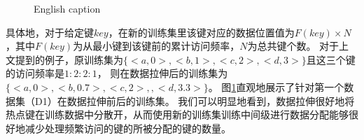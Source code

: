 
\begin{figure}[!htp]
  \centering
    {English caption}
  \label{fig:stretch}
\end{figure}

具体地，对于给定键$key$，在新的训练集里该键对应的数据位置值为$F(key) \times N$，其中$F(key)$为从最小键到该键前的累计访问频率，$N$为总共键个数。
对于上文提到的例子，原训练集为$\{<a, 0>, <b, 1>, <c, 2>, <d, 3>\}$且这三个键的访问频率是$1:2:2:1$，
则在数据拉伸后的训练集为$\{<a, 0>, <b, 0.7>, <c, 2>, , <d, 3.3>\}$。
图\ref{fig:stretch}直观地展示了针对第一个数据集（D1）在数据拉伸前后的训练集。
我们可以明显地看到，数据拉伸很好地将热点键在训练数据中分散开，从而使用新的训练集训练中间级{\model}进行数据分配能够很好地减少处理频繁访问的键的{\model}所被分配的键的数量。


